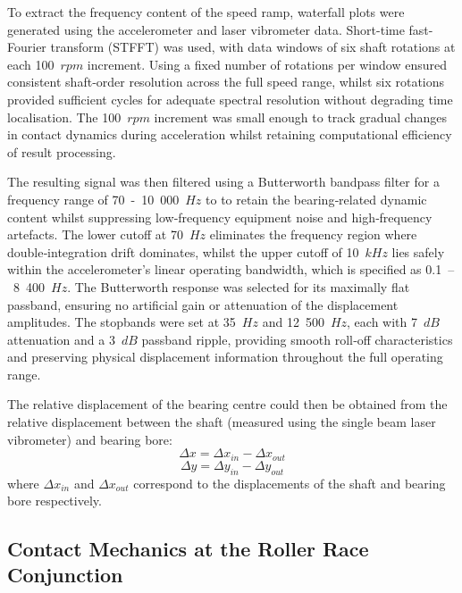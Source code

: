 To extract the frequency content of the speed ramp, waterfall plots were generated using the accelerometer and laser vibrometer data. Short-time fast-Fourier transform (STFFT) was used, with data windows of six shaft rotations at each 100~$rpm$ increment. Using a fixed number of rotations per window ensured consistent shaft‑order resolution across the full speed range, whilst six rotations provided sufficient cycles for adequate spectral resolution without degrading time localisation. The 100~$rpm$ increment was small enough to track gradual changes in contact dynamics during acceleration whilst retaining computational efficiency of result processing.

The resulting signal was then filtered using a Butterworth bandpass filter for a frequency range of 70~-~10~000~$Hz$ to to retain the bearing‑related dynamic content whilst suppressing low‑frequency equipment noise and high‑frequency artefacts. The lower cutoff at 70~$Hz$ eliminates the frequency region where double‑integration drift dominates, whilst the upper cutoff of 10~$kHz$ lies safely within the accelerometer’s linear operating bandwidth, which is specified as 0.1~–~8~400~$Hz$. The Butterworth response was selected for its maximally flat passband, ensuring no artificial gain or attenuation of the displacement amplitudes. The stopbands were set at 35~$Hz$ and 12~500~$Hz$, each with 7~$dB$ attenuation and a 3~$dB$ passband ripple, providing smooth roll‑off characteristics and preserving physical displacement information throughout the full operating range.

The relative displacement of the bearing centre could then be obtained from the relative displacement between the shaft (measured using the single beam laser vibrometer) and bearing bore:
\begin{equation}\label{relativdispaccelx}
	\Delta x = \Delta x_{in} - \Delta x_{out}
\end{equation}
\begin{equation}\label{relativdispaccely}
	\Delta y = \Delta y_{in} - \Delta y_{out}
\end{equation}
where $\Delta x_{in}$ and $\Delta x_{out}$ correspond to the displacements of the shaft and bearing bore respectively. 

\subsection{Contact Mechanics at the Roller Race Conjunction} \label{Contact mechanics experimental tribodynamics}

